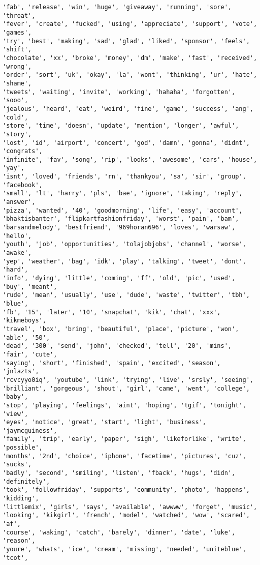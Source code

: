 \documentclass[11pt]{article}
\begin{document}
\begin{Verbatim}[commandchars=\\\{\}]
'fab', 'release', 'win', 'huge', 'giveaway', 'running', 'sore', 'throat',
'fever', 'create', 'fucked', 'using', 'appreciate', 'support', 'vote', 'games',
'try', 'best', 'making', 'sad', 'glad', 'liked', 'sponsor', 'feels', 'shift',
'chocolate', 'xx', 'broke', 'money', 'dm', 'make', 'fast', 'received', 'wrong',
'order', 'sort', 'uk', 'okay', 'la', 'wont', 'thinking', 'ur', 'hate', 'shame',
'tweets', 'waiting', 'invite', 'working', 'hahaha', 'forgotten', 'sooo',
'jealous', 'heard', 'eat', 'weird', 'fine', 'game', 'success', 'ang', 'cold',
'store', 'time', 'doesn', 'update', 'mention', 'longer', 'awful', 'story',
'lost', 'id', 'airport', 'concert', 'god', 'damn', 'gonna', 'didnt', 'congrats',
'infinite', 'fav', 'song', 'rip', 'looks', 'awesome', 'cars', 'house', 'yay',
'isnt', 'loved', 'friends', 'rn', 'thankyou', 'sa', 'sir', 'group', 'facebook',
'small', 'lt', 'harry', 'pls', 'bae', 'ignore', 'taking', 'reply', 'answer',
'pizza', 'wanted', '40', 'goodmorning', 'life', 'easy', 'account',
'bhaktisbanter', 'flipkartfashionfriday', 'worst', 'pain', 'bam',
'barsandmelody', 'bestfriend', '969horan696', 'loves', 'warsaw', 'hello',
'youth', 'job', 'opportunities', 'tolajobjobs', 'channel', 'worse', 'awake',
'yep', 'weather', 'bag', 'idk', 'play', 'talking', 'tweet', 'dont', 'hard',
'info', 'dying', 'little', 'coming', 'ff', 'old', 'pic', 'used', 'buy', 'meant',
'rude', 'mean', 'usually', 'use', 'dude', 'waste', 'twitter', 'tbh', 'blue',
'fb', '15', 'later', '10', 'snapchat', 'kik', 'chat', 'xxx', 'kikmeboys',
'travel', 'box', 'bring', 'beautiful', 'place', 'picture', 'won', 'able', '50',
'dead', '300', 'send', 'john', 'checked', 'tell', '20', 'mins', 'fair', 'cute',
'saying', 'short', 'finished', 'spain', 'excited', 'season', 'jnlazts',
'rcvcyyo0iq', 'youtube', 'link', 'trying', 'live', 'srsly', 'seeing',
'brilliant', 'gorgeous', 'shout', 'girl', 'came', 'went', 'college', 'baby',
'stop', 'playing', 'feelings', 'aint', 'hoping', 'tgif', 'tonight', 'view',
'eyes', 'notice', 'great', 'start', 'light', 'business', 'jaymcguiness',
'family', 'trip', 'early', 'paper', 'sigh', 'likeforlike', 'write', 'possible',
'months', '2nd', 'choice', 'iphone', 'facetime', 'pictures', 'cuz', 'sucks',
'badly', 'second', 'smiling', 'listen', 'fback', 'hugs', 'didn', 'definitely',
'took', 'followfriday', 'supports', 'community', 'photo', 'happens', 'kidding',
'littlemix', 'girls', 'says', 'available', 'awwww', 'forget', 'music',
'looking', 'kikgirl', 'french', 'model', 'watched', 'wow', 'scared', 'af',
'course', 'waking', 'catch', 'barely', 'dinner', 'date', 'luke', 'reason',
'youre', 'whats', 'ice', 'cream', 'missing', 'needed', 'uniteblue', 'tcot',

\end{Verbatim}
\end{document}

